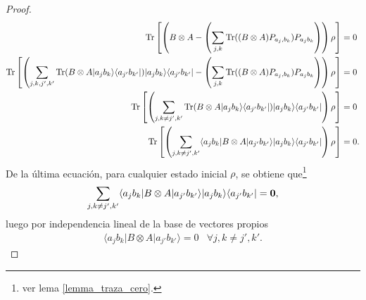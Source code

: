 \documentclass[12pt,oneside]{book}\raggedbottom{}
\begin{document}
\begin{proof}
\[\begin{split}
	{\rm Tr}\left[\left(B\otimes A-\left(\sum_{j,k}{\rm Tr}((B\otimes A) P_{a_j,b_k})P_{a_j b_k}\right)\right)\rho\right]&=0\\
{\rm Tr}\left[\left(\sum_{j,k,j',k'}{\rm Tr}(B\otimes A |a_j b_k\rangle \langle a_{j'}b_{k'}|)|a_j b_k\rangle \langle a_{j'}b_{k'}|-\left(\sum_{j,k}{\rm Tr}((B\otimes A) P_{a_j,b_k})P_{a_j b_k}\right)\right)\rho\right]&=0\\
{\rm Tr}\left[\left(\sum_{j,k\ne j',k'}{\rm Tr}(B\otimes A |a_j b_k\rangle \langle a_{j'}b_{k'}|)|a_j b_k\rangle \langle a_{j'}b_{k'}|\right)\rho\right]&=0\\
{\rm Tr}\left[\left(\sum_{j,k\ne j',k'}  \langle a_j b_k |B\otimes A|a_{j'}b_{k'}\rangle |a_j b_k\rangle \langle a_{j'}b_{k'}|\right)\rho\right]&=0.\\
\end{split}\]
De la última ecuación, para cualquier estado inicial $\rho$, se obtiene que\footnote[1]{ver lema {\ref{lemma_traza_cero}}.} 
\[\sum_{j,k\ne j', k'} \langle a_j b_k |B\otimes A|a_{j'}b_{k'}\rangle |a_j b_k\rangle \langle a_{j'}b_{k'}|=\mathbf{0},\] luego por independencia lineal de la base de vectores propios  
 \[\begin{array}{cc}
	\langle a_j b_k |B\otimes A|a_{j'}b_{k'}\rangle=0& \forall j,k\ne j',k'.\end{array}\]

	







\begin{comment}
	De ello  \[B\otimes A=\sum_{j,k} \tr((B\otimes A)P_{a_j, b_k})P_{a_j, b_k}=\sum_{j,k}d_{j,k}P_{a_j,b_k},\] notemos que
\[\begin{split}[A\otimes B, B\otimes A ]&= A\otimes B (B\otimes A)-B\otimes A (A\otimes B)\\
&=(\sum_{j,k}a_j b_k P_{a_j, b_k})(\sum_{i,l} \tr((B\otimes A)P_{a_i, b_l})P_{a_i, b_l})\\
&- (\sum_{i,l} \tr((B\otimes A)P_{a_i, b_l})P_{a_j, b_k})(\sum_{j,k}a_j b_k P_{a_j, b_k})\\
&=\sum_{j,k,i,l}a_j b_k  \tr((B\otimes A)P_{a_i, b_l})P_{a_j, b_k}P_{a_i, b_l}\\
&- (\sum_{i,l,j,k} a_j b_k \tr((B\otimes A)P_{a_i, b_l})P_{a_i, b_l} P_{a_j, b_k})\\
&=\sum_{j,k}a_j b_k  \tr((B\otimes A)P_{a_j, b_k})-\sum_{i,l} a_i b_l \tr((B\otimes A)P_{a_i, b_l})=\mathbf{0}\\
\end{split}\]
\end{comment}






\end{proof}
\end{document}
